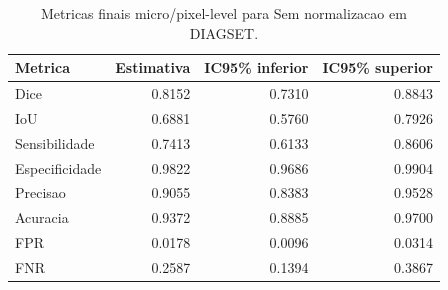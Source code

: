 \begin{table}[!htb]
\centering
\caption{Metricas finais micro/pixel-level para Sem normalizacao em DIAGSET.}
\label{tab:results_diagset-micro-not_normalized}
\small
\begin{tabular}{lrrr}
\toprule
Metrica & Estimativa & IC95\% inferior & IC95\% superior \\
\midrule
Dice & 0.8152 & 0.7310 & 0.8843 \\
IoU & 0.6881 & 0.5760 & 0.7926 \\
Sensibilidade & 0.7413 & 0.6133 & 0.8606 \\
Especificidade & 0.9822 & 0.9686 & 0.9904 \\
Precisao & 0.9055 & 0.8383 & 0.9528 \\
Acuracia & 0.9372 & 0.8885 & 0.9700 \\
FPR & 0.0178 & 0.0096 & 0.0314 \\
FNR & 0.2587 & 0.1394 & 0.3867 \\
\bottomrule
\end{tabular}
\end{table}
